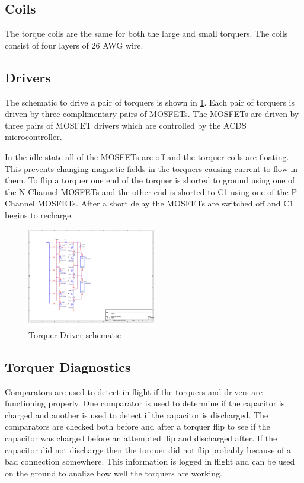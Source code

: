 \subsection{Coils}

The torque coils are the same for both the large and small torquers. The coils consist of four layers of 26 AWG wire.

\subsection{Drivers}

The schematic to drive a pair of torquers is shown in \cref{fig:drive}. Each pair of torquers is driven by three complimentary pairs of \acp{MOSFET}.  The \acp{MOSFET} are driven by three pairs of \ac{MOSFET} drivers which are controlled by the \ac{ACDS} microcontroller.

In the idle state all of the \acp{MOSFET} are off and the torquer coils are floating. This prevents changing magnetic fields in the torquers causing current to flow in them. To flip a torquer one end of the torquer is shorted to ground using one of the N-Channel \acp{MOSFET} and the other end is shorted to C1 using one of the P-Channel \acp{MOSFET}. After a short delay the \acp{MOSFET} are switched off and C1 begins to recharge.

\begin{figure}[H]
    \centering
    \includegraphics[width=0.5\textwidth]{Figures/driverSchematic}
    \caption{Torquer Driver schematic}
    \label{fig:drive}
\end{figure}

\subsection{Torquer Diagnostics}

Comparators are used to detect in flight if the torquers and drivers are functioning properly. One comparator is used to determine if the capacitor is charged and another is used to detect if the capacitor is discharged. The comparators are checked both before and after a torquer flip to see if the capacitor was charged before an attempted flip and discharged after. If the capacitor did not discharge then the torquer did not flip probably because of a bad connection somewhere. This information is logged in flight and can be used on the ground to analize how well the torquers are working.

